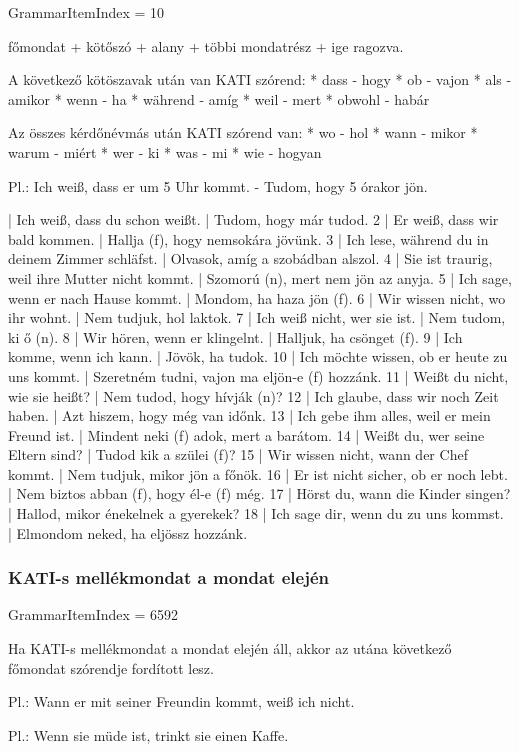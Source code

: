 \documentclass{article}
\newenvironment{desc}{\verbatim}{\endverbatim}
\newenvironment{exmp}{\verbatim}{\endverbatim}
\begin{document}
GrammarItemIndex = 10

\begin{desc}
főmondat + kötőszó + alany + többi mondatrész + ige ragozva.

A következő kötöszavak után van KATI szórend:
* dass - hogy
* ob - vajon
* als - amikor
* wenn - ha
* während - amíg
* weil - mert
* obwohl - habár

Az összes kérdőnévmás után KATI szórend van:
* wo - hol
* wann - mikor
* warum - miért
* wer - ki
* was - mi
* wie - hogyan

Pl.: Ich weiß, dass er um 5 Uhr kommt. - Tudom, hogy 5 órakor jön.
\end{desc}

\begin{exmp}
1 | Ich weiß, dass du schon weißt. | Tudom, hogy már tudod.
2 | Er weiß, dass wir bald kommen. | Hallja (f), hogy nemsokára jövünk.
3 | Ich lese, während du in deinem Zimmer schläfst. | Olvasok, amíg a szobádban alszol.
4 | Sie ist traurig, weil ihre Mutter nicht kommt. | Szomorú (n), mert nem jön az anyja.
5 | Ich sage, wenn er nach Hause kommt. | Mondom, ha haza jön (f).
6 | Wir wissen nicht, wo ihr wohnt. | Nem tudjuk, hol laktok.
7 | Ich weiß nicht, wer sie ist. | Nem tudom, ki ő (n).
8 | Wir hören, wenn er klingelnt. | Halljuk, ha csönget (f).
9 | Ich komme, wenn ich kann. | Jövök, ha tudok.
10 | Ich möchte wissen, ob er heute zu uns kommt. | Szeretném tudni, vajon ma eljön-e (f) hozzánk.
11 | Weißt du nicht, wie sie heißt? | Nem tudod, hogy hívják (n)?
12 | Ich glaube, dass wir noch Zeit haben. | Azt hiszem, hogy még van időnk.
13 | Ich gebe ihm alles, weil er mein Freund ist. | Mindent neki (f) adok, mert a barátom.
14 | Weißt du, wer seine Eltern sind? | Tudod kik a szülei (f)?
15 | Wir wissen nicht, wann der Chef kommt. | Nem tudjuk, mikor jön a főnök.
16 | Er ist nicht sicher, ob er noch lebt. | Nem biztos abban (f), hogy él-e (f) még.
17 | Hörst du, wann die Kinder singen? | Hallod, mikor énekelnek a gyerekek?
18 | Ich sage dir, wenn du zu uns kommst. | Elmondom neked, ha eljössz hozzánk.
\end{exmp}

\subsubsection{KATI-s mellékmondat a mondat elején}

GrammarItemIndex = 6592

\begin{desc}
Ha KATI-s mellékmondat a mondat elején áll, akkor az utána következő főmondat szórendje fordított lesz.

Pl.: Wann er mit seiner Freundin kommt, weiß ich nicht.

Pl.: Wenn sie müde ist, trinkt sie einen Kaffe.
\end{desc}
\end{document}

